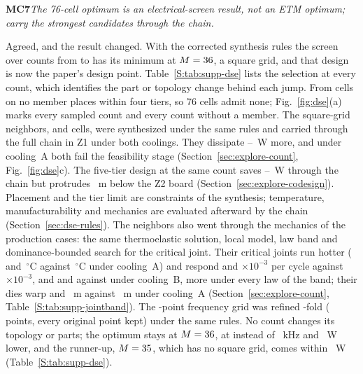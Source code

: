 \documentclass[10pt]{article}
\newcommand{\rc}[2]{\par\medskip\noindent\textbf{#1}\enspace\emph{#2}\par\smallskip\noindent}
\newcommand{\degC}{\,$^\circ$C}
\begin{document}
\rc{MC7}{The 76-cell optimum is an electrical-screen result, not an ETM optimum; carry the strongest
candidates through the chain.}
Agreed, and the result changed. With the corrected synthesis rules the screen over \FrDseNcounts{}
counts from \FrDseMlo{} to \FrDseMhi{} has its minimum at $M = 36$, a square grid, and that
design is now the paper's design point. Table~\ref{S:tab:supp-dse} lists the selection at every
count, which identifies the part or topology change behind each jump. From \FrDseInfeasLo{} cells on
no member places within four tiers, so 76 cells admit none; Fig.~\ref{fig:dse}(a) marks every
sampled count and every count without a member. The square-grid neighbors, \WrMloM{} and \WrMhiM{}
cells, were synthesized under the same rules and carried through the full chain in Z1 under both
coolings. They dissipate \FrChainMarginLo--\FrChainMarginHi~W more, and under cooling~A both fail the
feasibility stage (Section~\ref{sec:explore-count}, Fig.~\ref{fig:dse}c). The five-tier design at the
same count saves \FrTfiveSaveLo--\FrTfiveSaveHi~W through the chain but protrudes
\FrProtrudeTfive~\textmu m below the Z2 board (Section~\ref{sec:explore-codesign}). Placement and the
tier limit are constraints of the synthesis; temperature, manufacturability and mechanics are
evaluated afterward by the chain (Section~\ref{sec:dse-rules}). The neighbors also went through the
mechanics of the production cases: the same thermoelastic solution, local model, law band and
dominance-bounded search for the critical joint. Their critical joints run hotter
(\WrMloAZoneTsj{} and \WrMhiAZoneTsj\degC{} against \MvTsjAZone\degC{} under cooling~A) and respond
\WrMloAZoneEps{} and \WrMhiAZoneEps$\times10^{-3}$ per cycle against \MvEpsAZone$\times10^{-3}$, and
\WrMloBZoneEps{} and \WrMhiBZoneEps{} against \MvEpsBZone{} under cooling~B, more under every law of
the band; their dies warp \WrMloAZoneWarp{} and \WrMhiAZoneWarp~\textmu m against \WarpAZone~\textmu m
under cooling~A (Section~\ref{sec:explore-count}, Table~\ref{S:tab:supp-jointband}). The
\FrFswCoarseN-point frequency grid was refined \FrFswFineFactor-fold (\FrFswFineN{} points, every
original point kept) under the same rules. No count changes its topology or parts; the optimum stays
at $M = 36$, at \FrFswFineOptFsw{} instead of \FrConvFsw~kHz and \FrFswFineOptGain~W
lower, and the runner-up, $M = 35$, which has no square grid, comes within
\FrFswFineRunnerUpMargin~W (Table~\ref{S:tab:supp-dse}).
\end{document}
